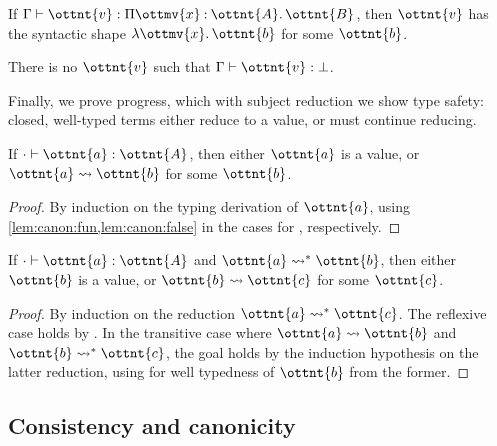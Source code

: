 \documentclass[a4paper,UKenglish,cleveref,autoref,thm-restate]{lipics-v2021}
\begin{document}
\begin{lemma} \label{lem:canon:fun}
  If $ \Gamma  \vdash  \ottnt{v}  \mathrel{:}   \Pi  \ottmv{x}  \mathbin{:}  \ottnt{A}  \mathpunct{.}  \ottnt{B}  $,
  then $\ottnt{v}$ has the syntactic shape $ \lambda  \ottmv{x}  \mathpunct{.}  \ottnt{b} $ for some $\ottnt{b}$.
\end{lemma}

\begin{lemma} \label{lem:canon:false}
  There is no $\ottnt{v}$ such that $ \Gamma  \vdash  \ottnt{v}  \mathrel{:}   \bot  $.
\end{lemma}

Finally, we prove progress, which with subject reduction we show type safety:
closed, well-typed terms either reduce to a value, or must continue reducing.

\begin{theorem}[Progress] \label{lem:progress}
  If $  \cdot   \vdash  \ottnt{a}  \mathrel{:}  \ottnt{A} $, then either $\ottnt{a}$ is a value,
  or $ \ottnt{a}  \rightsquigarrow  \ottnt{b} $ for some $\ottnt{b}$.
\end{theorem}

\begin{proof}
  By induction on the typing derivation of $\ottnt{a}$,
  using \cref{lem:canon:fun,lem:canon:false}
  in the cases for , respectively.
\end{proof}

\begin{theorem}
  If $  \cdot   \vdash  \ottnt{a}  \mathrel{:}  \ottnt{A} $ and $ \ottnt{a}  \rightsquigarrow^\ast  \ottnt{b} $,
  then either $\ottnt{b}$ is a value,
  or $ \ottnt{b}  \rightsquigarrow  \ottnt{c} $ for some $\ottnt{c}$.
\end{theorem}

\begin{proof}
  By induction on the reduction $ \ottnt{a}  \rightsquigarrow^\ast  \ottnt{c} $.
  The reflexive case holds by .
  In the transitive case where $ \ottnt{a}  \rightsquigarrow  \ottnt{b} $ and $ \ottnt{b}  \rightsquigarrow^\ast  \ottnt{c} $,
  the goal holds by the induction hypothesis on the latter reduction,
  using  for well typedness of $\ottnt{b}$
  from the former.
\end{proof}

\subsection{Consistency and canonicity} \label{sec:lr}
\end{document}
